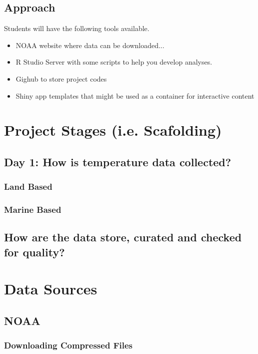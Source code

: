 \documentclass{article}\usepackage[]{graphicx}\usepackage[]{color}
\begin{document}
\subsection{Approach}

Students will have the following tools available.

\begin{itemize}
  \item NOAA website where data can be downloaded...
  \item R Studio Server with some scripts to help you develop analyses.
  \item Gighub to store project codes
  \item Shiny app templates that might be used as a container for interactive content
\end{itemize}

\section{Project Stages (i.e. Scafolding)}

\subsection{Day 1: How is temperature data collected?}

\subsubsection{Land Based}

\subsubsection{Marine Based}

\subsection{How are the data store, curated and checked for quality?}

\section{Data Sources}

\subsection{NOAA}

\subsubsection{Downloading Compressed Files}
\end{document}
